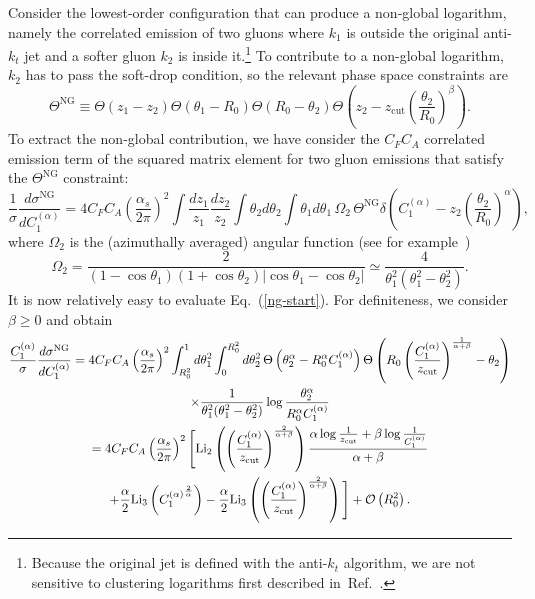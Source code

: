 \documentclass[letterpaper,11pt]{article}
\newcommand{\order}[1]{{\cal O}\left(#1\right)}
\newcommand{\C}[2]{C^{(#2)}_{#1}}
\newcommand{\zcut}{z_\text{cut}}
\newcommand{\ea}{{\C{1}{\alpha}}}
\DeclareRobustCommand{\Eq}[1]{Eq.~(\ref{#1})}
\DeclareRobustCommand{\Ref}[1]{Ref.~\cite{#1}}
\DeclareRobustCommand{\order}[1]{{\cal O}(#1)}
\begin{document}
Consider the lowest-order configuration that can produce a non-global logarithm, namely the correlated emission of two gluons where $k_1$ is outside the original anti-$k_t$ jet and a softer gluon $k_2$ is inside it.\footnote{Because the original jet is defined with the anti-$k_t$ algorithm, we are not sensitive to clustering logarithms first described in~\Ref{Banfi:2005gj}.}  To contribute to a non-global logarithm, $k_2$ has to pass the soft-drop condition, so the relevant phase space constraints are
\begin{equation}
\Theta^{\mathrm{NG}} \equiv \Theta \left (z_1-z_2 \right) \Theta \left( \theta_1-R_0 \right) \Theta \left(R_0-\theta_2 \right) \Theta \left(z_2-\zcut\left(\frac{\theta_2}{R_0} \right)^\beta  \right).
\end{equation}
To extract the non-global contribution, we have consider the $C_F C_A$ correlated emission term of the squared matrix element for two gluon emissions that satisfy the  $\Theta^{\mathrm{NG}}$ constraint:
\begin{equation} \label{ng-start}
\frac{1}{\sigma}\frac{d \sigma^\text{NG}}{d \ea}= 4 C_F C_A \left ( \frac{\alpha_s}{2 \pi} \right)^2 \int \frac{d z_1}{z_1} \frac{d z_2}{z_2} \int  \theta_2 d \theta_2 \int \theta_1 d \theta_1 \, \Omega_2 \, \Theta^{\mathrm{NG}}
\delta \left(\ea-z_2 \left( \frac{\theta_2}{R_0}\right)^\alpha \right),
\end{equation}
where $\Omega_2$ is the (azimuthally averaged) angular function (see for example~\cite{Dokshitzer:1992ip})
\begin{equation} \label{omega2}
\Omega_2 = \frac{2}{\left(1-\cos \theta_1\right)\left(1+\cos \theta_2\right) |\cos \theta_1-\cos \theta_2|}\simeq
 \frac{4}{\theta_1^2  (\theta_1^2- \theta_2^2)}.
\end{equation}
It is now relatively easy to evaluate \Eq{ng-start}. For definiteness, we consider $\beta\ge0$ and obtain
\begin{multline} \label{ng-result}
\frac{\ea}{\sigma}\frac{d \sigma^\text{NG}}{d \ea} = 4 C_F C_A \left ( \frac{\alpha_s}{2 \pi} \right)^2 
\int_{R_0^2}^1 d \theta_1^2 \int_0^{R_0^2} d \theta_2^2 \, \Theta \left(\theta_2^\alpha - R_0^\alpha \ea   \right)
\Theta \left( R_0 \left(\frac{\ea}{\zcut}\right)^{\frac{1}{\alpha+\beta}}- \theta_2  \right)\\ \times
\frac{1}{\theta_1^2  (\theta_1^2- \theta_2^2)} 
\log \frac{\theta_2^\alpha}{R_0^\alpha \ea}\\
=  4 C_F C_A \left ( \frac{\alpha_s}{2 \pi} \right)^2 \Bigg [  {\rm Li}_2\left(\left(\frac{\ea}{\zcut}\right)^\frac{2}{\alpha+\beta}\right) \frac{\alpha \log \frac{1}{\zcut}+\beta \log\frac{1}{ \ea}}{\alpha+\beta} \\+\frac{\alpha}{2}{\rm Li}_3\left( \ea^\frac{2}{\alpha} \right)- \frac{\alpha}{2} {\rm Li}_3\left( \left(\frac{\ea}{\zcut}\right)^\frac{2}{\alpha+\beta} \right) \Bigg]+\order{R_0^2}.
\end{multline}
\end{document}
